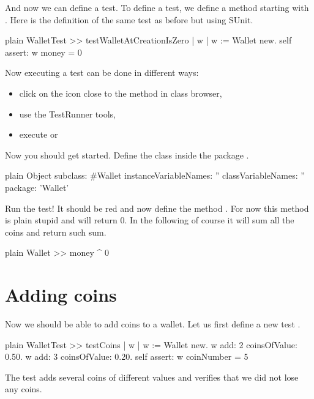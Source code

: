 \documentclass[10pt,twoside,english]{_support/latex/sbabook/sbabook}
\begin{document}
And now we can define a test. To define a test, we define a method starting with .
Here is the definition of the same test as before but using SUnit.  

\begin{displaycode}{plain}
WalletTest >> testWalletAtCreationIsZero
	| w |
	w := Wallet new.
	self assert: w money = 0
\end{displaycode}

Now executing a test can be done in different ways:

\begin{itemize}
\item click on the icon close to the method in class browser,
\item use the TestRunner tools, 
\item execute  or 
\end{itemize}

Now you should get started. Define the class  inside the package .

\begin{displaycode}{plain}
Object subclass: #Wallet
	instanceVariableNames: ''
	classVariableNames: ''
	package: 'Wallet'	
\end{displaycode}

Run the test! It should be red and now define the method . For now this method is plain stupid and will return 0.
In the following of course it will sum all the coins and return such sum.

\begin{displaycode}{plain}
Wallet >> money
   ^ 0
\end{displaycode}
\section{Adding coins}
Now we should be able to add coins to a wallet. Let us first define a new test .

\begin{displaycode}{plain}
WalletTest >> testCoins
	| w |
	w := Wallet new.
	w add: 2 coinsOfValue: 0.50.
	w add: 3 coinsOfValue: 0.20.
	self assert: w coinNumber = 5
\end{displaycode}

The test adds several coins of different values and verifies that we did not lose any coins.
\end{document}
